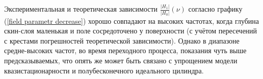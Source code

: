 \documentclass[a4paper, 12pt]{article} %
\begin{document}
	Экспериментальная и теоретическая зависимости $\frac{|H_1|}{|H_0|} (\nu)$ согласно графику (\ref{field parametr decrease}) хорошо совпадают на высоких частотах, когда глубина скин-слоя маленькая и поле сосредоточено у поверхности (с учётом пересечений с крестами погрешностей теоретической зависимости). Однако в диапазоне средне-высоких частот, во время переходного процесса, показания чуть выше предсказываемых, что опять же может быть связано с упрощением модели квазистационарности и полубесконечного идеального цилиндра.

    
\end{document}
